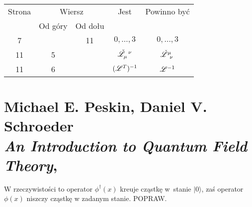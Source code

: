 \documentclass[a4paper,11pt]{article}
\numberwithin{equation}{section}
\begin{document}
\newpage



\begin{center}

  \begin{tabular}{|c|c|c|c|c|}
    \hline
    Strona & \multicolumn{2}{c|}{Wiersz} & Jest
                              & Powinno być \\ \cline{2-3}
    & Od góry & Od dołu & & \\
    \hline
    7   & & 11 & $0, \ldots,\!3$ & $0, \ldots, 3$ \\
    11  &  5 & & $\tensor[]{ \check{ \Lcal } }{ _{ \mu }^{ \nu } }$
           & $\tensor[]{ \check{ \Lcal } }{ ^{ \mu }_{ \nu } }$ \\
    11  &  6 & & $( \mathcal{L}^{ T } )^{ -1 }$ & $\mathcal{L}^{ -1 }$ \\
    \hline
  \end{tabular}

\end{center}

\VerSpaceTwo












\newpage

\section{ %
  Michael E. Peskin, Daniel V. Schroeder \\
  \textit{An Introduction to Quantum Field Theory},
  \cite{PeskinSchroederIntroductionToQuantumFieldTheory1995}}


\vspace{0em}



\vspace{0em}


\noindent
{} W rzeczywistości to operator $\phi^{ \dagger }( x )$ kreuje cząstkę
w~stanie $| 0 \rangle$, zaś operator $\phi( x )$ niszczy cząstkę w zadanym stanie.
POPRAW.
\end{document}
